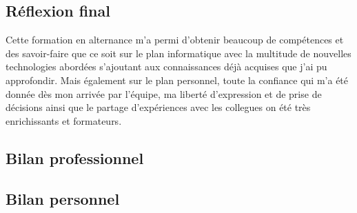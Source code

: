 \subsection{Réflexion final}
Cette formation en alternance m'a permi d'obtenir beaucoup de compétences et des
savoir-faire que ce soit sur le plan informatique avec la multitude de nouvelles
technologies abordées s'ajoutant aux connaissances déjà acquises que j'ai pu
approfondir. Mais également sur le plan personnel, toute la confiance qui m'a
été donnée dès mon arrivée par l'équipe, ma liberté d'expression et de prise de
décisions ainsi que le partage d'expériences avec les collegues on été très
enrichissants et formateurs.

\subsection{Bilan professionnel}

\subsection{Bilan personnel}
